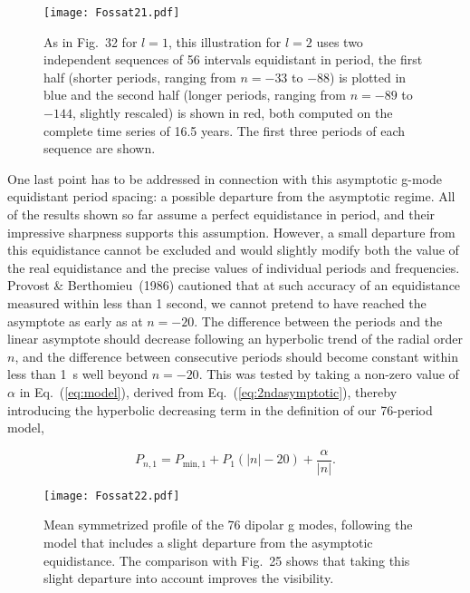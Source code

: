 \documentclass[bibyear]{aa}
\begin{document}
\begin{figure}
\centering
\texttt{[image: Fossat21.pdf]}
\caption{As in Fig.~32 for $l=1$, this illustration for $l=2$ uses two independent sequences of 56 intervals equidistant in period, the first half (shorter periods, ranging from $n=-33$ to $-88$) is plotted in blue and the second half (longer periods, ranging from $n=-89$ to $-144$, slightly rescaled) is shown in red, both computed on the complete time series of 16.5 years. The first three periods of each sequence are shown.}
\label{fig:C2_cut_33-88_89-144}
\end{figure} 


One last point has to be addressed in connection with this asymptotic g-mode equidistant period spacing: a possible departure from the asymptotic regime. All of the results shown so far assume a perfect equidistance in period, and their impressive sharpness supports this assumption. However, a small departure from this equidistance cannot be excluded and would slightly modify both the value of the real equidistance and the precise values of individual periods and frequencies. Provost \& Berthomieu~(1986) cautioned that at such accuracy of an equidistance measured within less than 1 second, we cannot pretend to have reached the asymptote as early as at $n = -20$. The difference between the periods and the linear asymptote should decrease following an hyperbolic trend of the radial order $n$, and the difference between consecutive periods should become constant within less than 1~s well beyond $n= -20$.
This was tested by taking a non-zero value of $\alpha$ in Eq.~(\ref{eq:model}), derived from Eq.~(\ref{eq:2ndasymptotic}), thereby 
introducing the hyperbolic decreasing term in the definition  of our 76-period model, 

\begin{equation}\label{eq:model}
P_{n,1} = P_{\mathrm{min},1} + P_1( |n|-20)+{\frac{\alpha}{|n|}}
.\end{equation} 

\begin{figure} 
\centering
\texttt{[image: Fossat22.pdf]}
\caption{Mean symmetrized profile of the 76 dipolar g modes,  following the model that includes a slight departure from the asymptotic equidistance. The comparison with Fig.~25 shows that taking this slight departure into account improves the visibility.}
\label{fig:M_sym}
\end{figure} 
\end{document}
